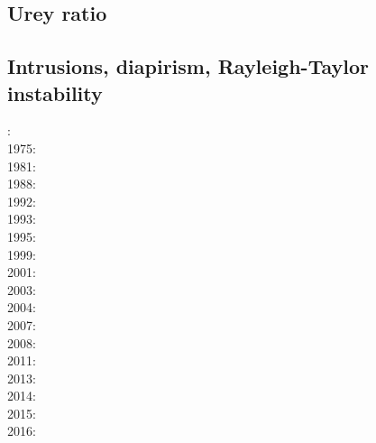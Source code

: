 {\scriptsize
\noindent
\cite{tite94}
\cite{thsj97}
\cite{konc03}\cite{upke03}
\cite{legs11}
\cite{naam17}\cite{rugb17}
\cite{naam18}
}

\subsection{Urey ratio}

{\scriptsize
\cite{kore08}
\cite{nata12} 
}

\subsection{Intrusions, diapirism, Rayleigh-Taylor instability}

{\scriptsize
{}: \cite{bers72}\\
1975: \cite{dixo75}\\
1981: \cite{brpo81}\\
1988: \cite{sccm88}\\
1992: \cite{vayv92}\cite{zaju92}\cite{wein92}\cite{wesc92}\cite{veja92}\\
1993: \cite{kesb93}\cite{nabr93}\cite{potp93}\cite{povp93}\cite{vasv93}\cite{pocp93}
      \cite{popt93}\cite{wein93}\cite{vayv93}\\
1995: \cite{wepo95}\cite{bisc95}\cite{wepo95}\\
1999: \cite{drdv99}\\
2001: \cite{kapo01}\cite{drvc01}\\
2003: \cite{geur03}\cite{vavd03}\\
2004: \cite{gepm04}\cite{istt04}\cite{geur04}\\
2007: \cite{gebu07}\\
2008: \cite{buge08}\cite{zlfd08}\cite{mohc98}\\
2011: \cite{ellw11}\cite{pege11}\\
2013: \cite{fusc13}\\
2014: \cite{feka14b}\\
2015: \cite{feka15}\cite{fuks15}\\
2016: \cite{cakp16}
}

